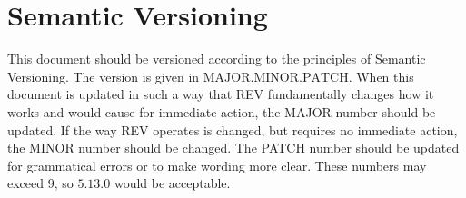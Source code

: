 \section{Semantic Versioning}
\label{constitution_semver}

This document should be versioned according to the principles of Semantic Versioning. The version is given in $\text{MAJOR}.\text{MINOR}.\text{PATCH}$. When this document is updated in such a way that REV fundamentally changes how it works and would cause for immediate action, the MAJOR number should be updated. If the way REV operates is changed, but requires no immediate action, the MINOR number should be changed. The PATCH number should be updated for grammatical errors or to make wording more clear. These numbers may exceed 9, so $5.13.0$ would be acceptable.